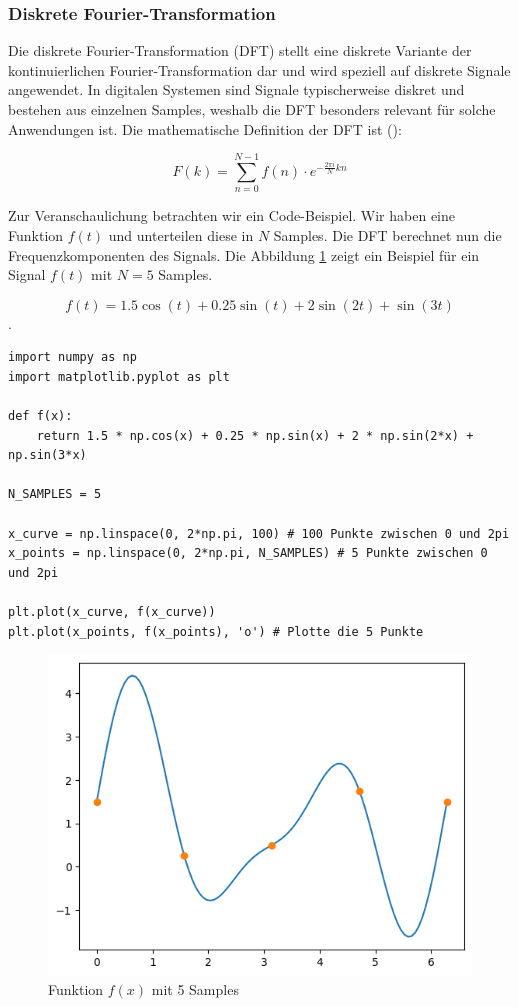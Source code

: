 \documentclass[11pt,a4paper]{article}
\begin{document}
\subsubsection{Diskrete Fourier-Transformation}

Die diskrete Fourier-Transformation (DFT) stellt eine diskrete Variante der kontinuierlichen
Fourier-Transformation dar und wird speziell auf diskrete Signale angewendet. In digitalen
Systemen sind Signale typischerweise diskret und bestehen aus einzelnen Samples, weshalb die DFT
besonders relevant für solche Anwendungen ist. Die mathematische Definition der DFT ist
(\cite[Chapter~3]{hansen2014fourier}):

\[
	F(k) = \sum_{n=0}^{N-1} f(n) \cdot e^{-\frac{2\pi i}{N} kn}
\]

\noindent
\newline
Zur Veranschaulichung betrachten wir ein Code-Beispiel. Wir haben eine Funktion \(f(t)\) und unterteilen
diese in \(N\) Samples. Die DFT berechnet nun die Frequenzkomponenten des Signals. Die Abbildung
\ref{fig:dft_example} zeigt ein Beispiel für ein Signal \(f(t)\) mit \(N=5\) Samples.

\[ f(t) = 1.5 \cos(t) + 0.25 \sin(t) + 2 \sin(2t) + \sin(3t) \].


\begin{lstlisting}
import numpy as np
import matplotlib.pyplot as plt

def f(x):
    return 1.5 * np.cos(x) + 0.25 * np.sin(x) + 2 * np.sin(2*x) + np.sin(3*x)

N_SAMPLES = 5

x_curve = np.linspace(0, 2*np.pi, 100) # 100 Punkte zwischen 0 und 2pi
x_points = np.linspace(0, 2*np.pi, N_SAMPLES) # 5 Punkte zwischen 0 und 2pi

plt.plot(x_curve, f(x_curve))
plt.plot(x_points, f(x_points), 'o') # Plotte die 5 Punkte
\end{lstlisting}

\begin{figure}[h]
	\centering
	\includegraphics[width=0.60\linewidth]{img/dft.png}
	\caption{Funktion \( f(x) \) mit 5 Samples}
	\label{fig:dft_example}
\end{figure}
\end{document}
